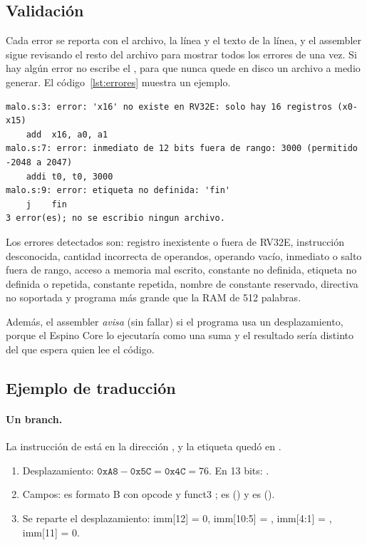 \subsection{Validación}

Cada error se reporta con el archivo, la línea y el texto de la línea, y el assembler
sigue revisando el resto del archivo para mostrar todos los errores de una vez. Si hay
algún error no escribe el , para que nunca quede en disco un archivo a medio
generar. El código~\ref{lst:errores} muestra un ejemplo.

\begin{lstlisting}[caption={Salida del assembler ante un programa con errores.}, label={lst:errores}]
malo.s:3: error: 'x16' no existe en RV32E: solo hay 16 registros (x0-x15)
    add  x16, a0, a1
malo.s:7: error: inmediato de 12 bits fuera de rango: 3000 (permitido -2048 a 2047)
    addi t0, t0, 3000
malo.s:9: error: etiqueta no definida: 'fin'
    j    fin
3 error(es); no se escribio ningun archivo.
\end{lstlisting}

Los errores detectados son: registro inexistente o fuera de RV32E, instrucción
desconocida, cantidad incorrecta de operandos, operando vacío, inmediato o salto fuera
de rango, acceso a memoria mal escrito, constante no definida, etiqueta no definida o
repetida, constante repetida, nombre de constante reservado, directiva no soportada y
programa más grande que la RAM de 512 palabras.

Además, el assembler \emph{avisa} (sin fallar) si el programa usa un desplazamiento,
porque el Espino Core lo ejecutaría como una suma y el resultado sería distinto del que
espera quien lee el código.

\subsection{Ejemplo de traducción}

\paragraph{Un branch.} La instrucción  de  está en
la dirección , y la etiqueta  quedó en .

\begin{enumerate}
  \item Desplazamiento: $\texttt{0xA8} - \texttt{0x5C} = \texttt{0x4C} = 76$. En 13
        bits: .
  \item Campos:  es formato B con opcode  y funct3 ;
         es  () y  es  ().
  \item Se reparte el desplazamiento: imm[12] = 0, imm[10:5] = ,
        imm[4:1] = , imm[11] = 0.
\end{enumerate}

